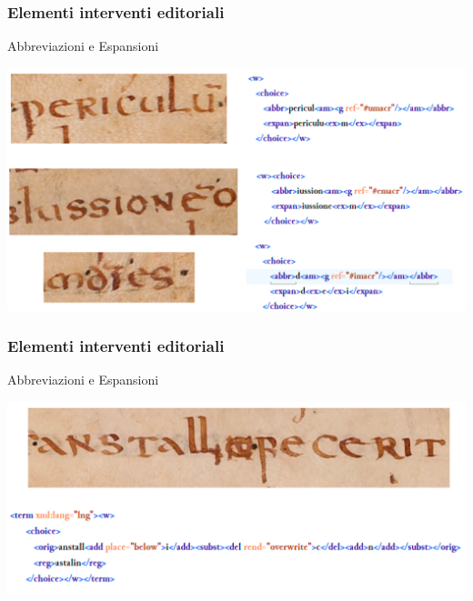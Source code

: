 \begin{frame}
    \frametitle{Elementi interventi editoriali}
    \addtocounter{nframe}{1}
    
   
    \begin{block}{Abbreviazioni e Espansioni}
        \begin{center}
            \includegraphics[width=.9\textwidth]{imgs/Abbreviazioni-1.png}
        \end{center}

    \end{block}
    
\end{frame}

\begin{frame}
    \frametitle{Elementi interventi editoriali}
    \addtocounter{nframe}{1}
    
   
    \begin{block}{Abbreviazioni e Espansioni}
        \begin{center}
            \includegraphics[width=.9\textwidth]{imgs/Aggiunta-cancellatura-regolarizzazione.png}
        \end{center}

    \end{block}
    
\end{frame}

